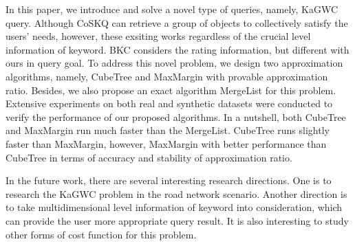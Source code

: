 In this paper, we introduce and solve a novel type of queries, namely, KaGWC query. Although CoSKQ can retrieve a group of objects to collectively satisfy the users' needs, however, these exsiting works regardless of the crucial level information of keyword. BKC \cite{deng2015best} considers the rating information, but different with ours in query goal. To address this novel problem, we design two approximation algorithms, namely, CubeTree and MaxMargin with provable approximation ratio. Besides, we also propose an exact algorithm MergeList for this problem. Extensive experiments on both real and synthetic datasets were conducted to verify the performance of our proposed algorithms. In a nutshell, both CubeTree and MaxMargin run much faster than the MergeList. CubeTree runs slightly faster than MaxMargin, however, MaxMargin with better performance than CubeTree in terms of accuracy and stability of approximation ratio.

In the future work, there are several interesting research directions. One is to research the KaGWC problem in the road network scenario. Another direction is to take multidimensional level information of keyword into consideration, which can provide the user more appropriate query result. It is also interesting to study other forms of cost function for this problem.
